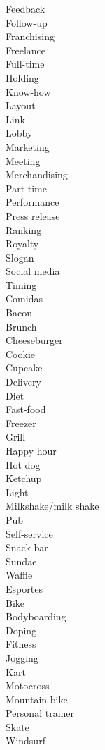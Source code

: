 \documentclass[12pt,a4paper]{article} %
\begin{document}
Feedback\\
Follow-up\\
Franchising\\
Freelance\\
Full-time\\
Holding\\
Know-how\\
Layout\\
Link\\
Lobby\\
Marketing\\
Meeting\\
Merchandising\\
Part-time\\
Performance\\
Press release\\
Ranking\\
Royalty\\
Slogan\\
Social media\\
Timing\\

Comidas\\

Bacon\\
Brunch\\
Cheeseburger\\
Cookie\\
Cupcake\\
Delivery\\
Diet\\
Fast-food\\
Freezer\\
Grill\\
Happy hour\\
Hot dog\\
Ketchup\\
Light\\
Milkshake/milk shake\\
Pub\\
Self-service\\
Snack bar\\
Sundae\\
Waffle\\

Esportes\\

Bike\\
Bodyboarding\\
Doping\\
Fitness\\
Jogging\\
Kart\\
Motocross\\
Mountain bike\\
Personal trainer\\
Skate \\
Windsurf\\
\end{document}
